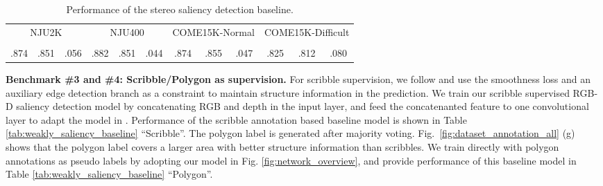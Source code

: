 \documentclass[10pt,twocolumn,letterpaper]{article}
\def\ourdataset{COME15K}
\begin{document}
\begin{table}[t!]
  \centering
  \scriptsize
  \renewcommand{\arraystretch}{1.0}
  \renewcommand{\tabcolsep}{0.5mm}
  \caption{Performance of the stereo saliency detection baseline.
  }
  \begin{tabular}{ccc|ccc|ccc|ccc}
  \hline
\multicolumn{3}{c|}{NJU2K\cite{NJU2000}}&\multicolumn{3}{c|}{NJU400\cite{NJU400}}&\multicolumn{3}{c|}{\ourdataset-Normal}&\multicolumn{3}{c}{\ourdataset-Difficult} \\
     &  & 
    &  &  & 
    &  &  & 
    &  &  &  \\
  \hline
    .874 & .851 & .056 & .882 & .851 & .044 & .874 & .855 & .047 & .825 & .812 & .080  \\
   \hline
  \end{tabular}
  \label{tab:stereo_saliency_baseline}
\end{table}







\noindent\textbf{Benchmark \#3 and \#4: Scribble/Polygon as supervision.}
For scribble supervision,
we follow \cite{jing2020weakly} and use the smoothness loss and an auxiliary edge detection branch as a constraint to maintain structure information in the prediction.
We train our scribble supervised RGB-D saliency detection model by concatenating RGB and depth in the input layer, and feed the concatenanted feature to one  convolutional layer to adapt the model in \cite{jing2020weakly}. Performance of the scribble annotation based baseline model is shown in Table \ref{tab:weakly_saliency_baseline} \enquote{Scribble}.
The polygon label is generated after
majority voting. Fig.~\ref{fig:dataset_annotation_all} (g) shows that the polygon label covers a larger area with better structure information than scribbles.
We
train directly with polygon annotations as pseudo labels by adopting our model in Fig. \ref{fig:network_overview}, and provide performance of this baseline model in Table \ref{tab:weakly_saliency_baseline} \enquote{Polygon}.
\end{document}
